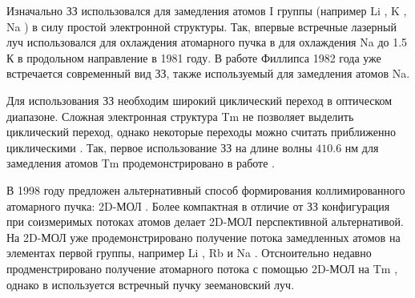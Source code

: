


% 

Изначально ЗЗ использовался для замедления атомов I группы (например 
Li \cite{stack_ultra-cold_2010}, 
K \cite{Lee2007}, %
Na \cite{zhao2014optimizing}) в силу простой электронной структуры. Так, впервые встречные лазерный луч использовался для охлаждения атомарного пучка в \cite{__1981} для охлаждения Na до 1.5\,К в продольном направление в 1981 году. В работе Филлипса \cite{PhysRevLett.48.596} 1982 года уже встречается современный вид ЗЗ, также используемый для замедления атомов Na. 

Для использования ЗЗ необходим широкий циклический переход в оптическом диапазоне. Сложная электронная структура Tm не позволяет выделить циклический переход, однако некоторые переходы можно считать приближенно циклическими \cite{Kolachevsky2007}. Так, первое использование ЗЗ на длине волны $410.6$ нм для замедления атомов Tm продемонстрировано в работе \cite{Chebakov_2009}. 


В 1998 году предложен альтернативный способ формирования коллимированного атомарного пучка: 2D-МОЛ \cite{PhysRevA.58.3891}. Более компактная в отличие от ЗЗ конфигурация при соизмеримых потоках атомов делает 2D-МОЛ перспективной альтернативой. На 2D-МОЛ уже продемонстрировано получение потока замедленных атомов на элементах первой группы, например Li \cite{tiecke_high-flux_2009}, Rb \cite{ravenhall_high-flux_2021} и Na \cite{Lamporesi_2013}. Отсноительно недавно продменстрировано получение атомарного потока с помощью 2D-МОЛ на Tm \cite{golovizin_compact_2021}, однако в \cite{golovizin_compact_2021} используется встречный пучку зеемановский луч. 



